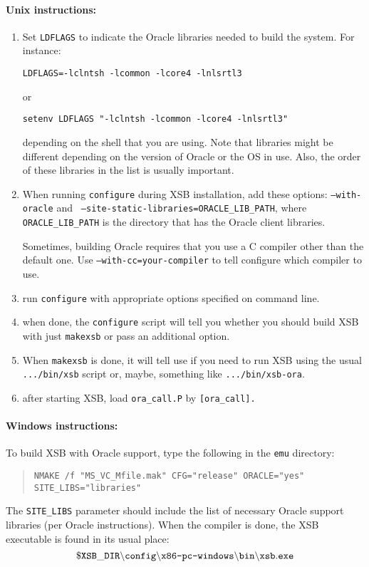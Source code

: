 \paragraph{Unix instructions:}
\begin{enumerate}
\item Set {\tt LDFLAGS} to indicate the Oracle libraries needed to build
  the system. For instance:
\begin{verbatim}
LDFLAGS=-lclntsh -lcommon -lcore4 -lnlsrtl3
\end{verbatim}
or
\begin{verbatim}
setenv LDFLAGS "-lclntsh -lcommon -lcore4 -lnlsrtl3"  
\end{verbatim}
depending on the shell that you are using.
Note that libraries might be different depending on the version of Oracle
or the OS in use. Also, the order of these libraries in the list is usually
important.
\item When running {\tt configure} during XSB installation, add these
  options: {\tt --with-oracle} and {\tt
    --site-static-libraries=ORACLE\_LIB\_PATH}, where {\tt
    ORACLE\_LIB\_PATH} is the directory that has the Oracle client
  libraries.

  Sometimes, building Oracle requires that you use a C compiler other than
  the default one. Use {\tt --with-cc=your-compiler} to tell configure
  which compiler to use.
\item run {\tt configure} with appropriate options specified on command
  line.
\item when done, the {\tt configure} script will tell you  whether you
  should build XSB with just {\tt makexsb} or pass an additional option. 
\item When {\tt makexsb} is done, it will tell use if you need to run XSB
  using the usual {\tt .../bin/xsb} script or, maybe, something like
  {\tt .../bin/xsb-ora}.
\item after starting XSB, load {\tt ora\_call.P} by {\tt [ora\_call].}
\end{enumerate}

\paragraph{Windows instructions:}
To build XSB with Oracle support, type the following in the {\tt emu}
directory: 
\begin{quote}
 {\tt NMAKE /f "MS\_VC\_Mfile.mak" CFG="release" ORACLE="yes" SITE\_LIBS="libraries"  }
\end{quote}
The {\tt SITE\_LIBS} parameter should include the list of necessary Oracle
support libraries (per Oracle instructions). When the compiler is done, the 
XSB executable is found in its usual place:
\[
 \tt
 \$XSB\_DIR\backslash config\backslash \mbox{\tt x86-pc-windows}\backslash bin
 \backslash xsb.exe
\]


